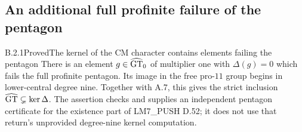 \subsection{An additional full profinite failure of the pentagon}

\begin{result}{B.2.1}{Proved}{The kernel of the CM character contains elements failing the pentagon}
There is an element $g\in\widehat{\mathrm{GT}}_0$ of multiplier one with
$\Delta(g)=0$ which fails the full profinite pentagon.
Its image in the free pro-$11$ group begins in lower-central
degree nine. Together with A.7, this gives the strict inclusion
$\widehat{\mathrm{GT}}\subsetneq\ker\Delta$. The assertion checks and supplies
an independent pentagon certificate for the existence part of
LM7\_PUSH D.52; it does not use that return's unprovided
degree-nine kernel computation.
\end{result}
